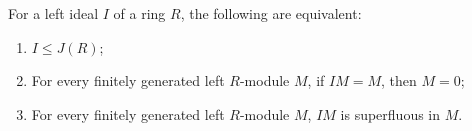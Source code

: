 For a left ideal $I$ of a ring $R$, the following are equivalent:
\begin{enumerate}
\item[(a)] $I \leq J(R)$;
\item[(b)] For every finitely generated left $R$-module $M$, if $IM = M$, then $M = 0$;
\item[(c)] For every finitely generated left $R$-module $M$, $IM$ is superfluous in $M$.
\end{enumerate}
